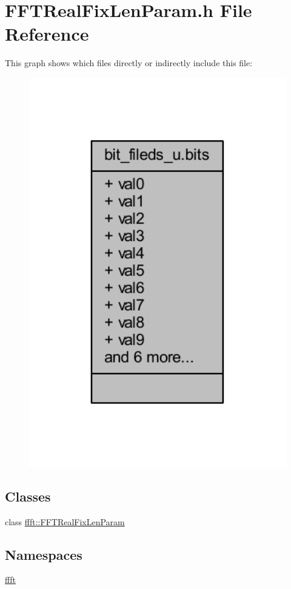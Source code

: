 \hypertarget{a00099}{\section{F\+F\+T\+Real\+Fix\+Len\+Param.\+h File Reference}
\label{a00099}
}
This graph shows which files directly or indirectly include this file\+:
\nopagebreak
\begin{figure}[H]
\begin{center}
\leavevmode
\includegraphics[width=350pt]{d9/d8d/a00262}
\end{center}
\end{figure}
\subsection*{Classes}
\begin{DoxyCompactItemize}
\item 
class \hyperlink{a00012}{ffft\+::\+F\+F\+T\+Real\+Fix\+Len\+Param}
\end{DoxyCompactItemize}
\subsection*{Namespaces}
\begin{DoxyCompactItemize}
\item 
 \hyperlink{a00142}{ffft}
\end{DoxyCompactItemize}
